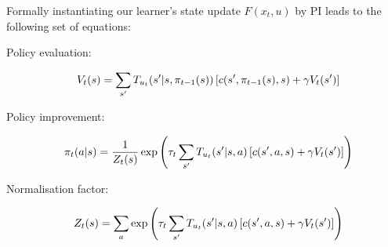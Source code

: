 Formally instantiating our learner's state update $F(x_t,u)$ by PI
leads to the following set of equations: %
\begin{description}
\item[Policy evaluation:]
\[\hspace{-20pt}V_t(s)=\sum\limits_{s'}T_{u_t}(s'|s,\pi_{t-1}(s))\left[
    c(s',\pi_{t-1}(s),s)+\gamma V_t(s')
    \right]\]

\item[Policy improvement:]
\[\hspace{-20pt}\pi_t(a|s)=\frac{1}{Z_t(s)}\exp\left(\tau_t\sum\limits_{s'}T_{u_t}(s'|s,a)\left[
    c(s',a,s)+\gamma V_t(s')
    \right]\right) \]
    
\item[Normalisation factor:]
\[\hspace{-20pt}Z_t(s)=\sum\limits_a\exp\left(\tau_t\sum\limits_{s'}T_{u_t}(s'|s,a)\left[
    c(s',a,s)+\gamma V_t(s') \right]\right)\]
\end{description}
    

